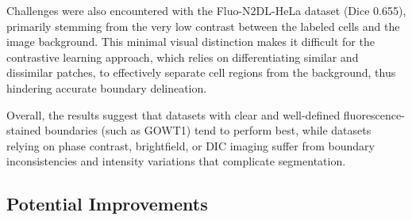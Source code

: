 \documentclass[./dissertation.tex]{subfiles}
\begin{document}
Challenges were also encountered with the Fluo-N2DL-HeLa dataset (Dice 0.655), primarily stemming from the very low contrast between the labeled cells and the image background. This minimal visual distinction makes it difficult for the contrastive learning approach, which relies on differentiating similar and dissimilar patches, to effectively separate cell regions from the background, thus hindering accurate boundary delineation.


Overall, the results suggest that datasets with clear and well-defined fluorescence-stained boundaries (such as GOWT1) tend to perform best, while datasets relying on phase contrast, brightfield, or DIC imaging suffer from boundary inconsistencies and intensity variations that complicate segmentation.


\subsection{Potential Improvements}
\end{document}
